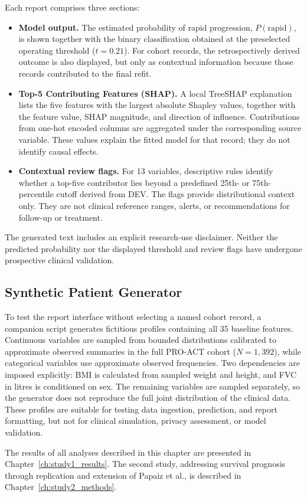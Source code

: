 Each report comprises three sections:
\begin{itemize}
  \item \textbf{Model output.} The estimated probability of rapid progression, $P(\text{rapid})$, is shown together with the binary classification obtained at the preselected operating threshold ($t=0.21$).
  For cohort records, the retrospectively derived outcome is also displayed, but only as contextual information because those records contributed to the final refit.
  \item \textbf{Top-5 Contributing Features (\gls{SHAP}).} A local TreeSHAP explanation lists the five features with the largest absolute Shapley values, together with the feature value, \gls{SHAP} magnitude, and direction of influence.
  Contributions from one-hot encoded columns are aggregated under the corresponding source variable.
  These values explain the fitted model for that record; they do not identify causal effects.
  \item \textbf{Contextual review flags.} For 13 variables, descriptive rules identify whether a top-five contributor lies beyond a predefined 25th- or 75th-percentile cutoff derived from \gls{DEV}.
  The flags provide distributional context only.
  They are not clinical reference ranges, alerts, or recommendations for follow-up or treatment.
\end{itemize}

The generated text includes an explicit research-use disclaimer.
Neither the predicted probability nor the displayed threshold and review flags have undergone prospective clinical validation.

\subsection{Synthetic Patient Generator}
\label{subsec:methods_random_patient}
To test the report interface without selecting a named cohort record, a companion script generates fictitious profiles containing all 35 baseline features.
Continuous variables are sampled from bounded distributions calibrated to approximate observed summaries in the full \gls{PRO-ACT} cohort ($N=1{,}392$), while categorical variables use approximate observed frequencies.
Two dependencies are imposed explicitly: \gls{BMI} is calculated from sampled weight and height, and \gls{FVC} in litres is conditioned on sex.
The remaining variables are sampled separately, so the generator does not reproduce the full joint distribution of the clinical data.
These profiles are suitable for testing data ingestion, prediction, and report formatting, but not for clinical simulation, privacy assessment, or model validation.

\bigskip
\noindent
The results of all analyses described in this chapter are presented in Chapter~\ref{ch:study1_results}.
The second study, addressing survival prognosis through replication and extension of Papaiz et al., is described in Chapter~\ref{ch:study2_methods}.

